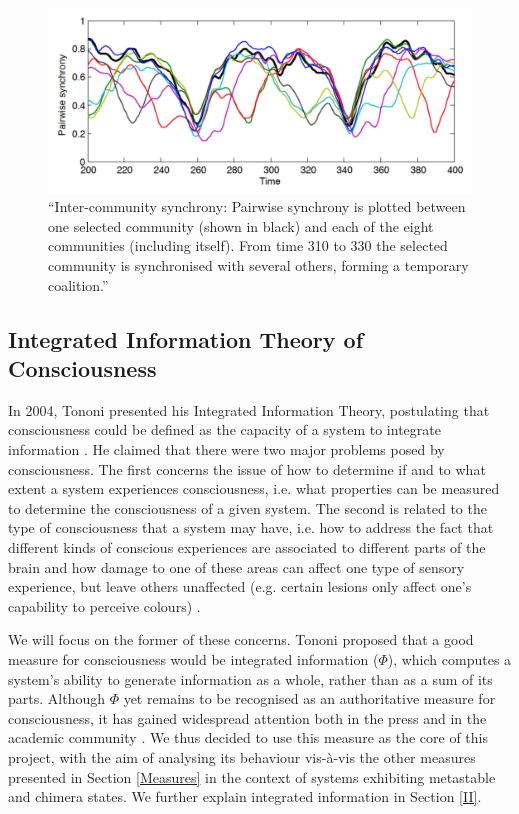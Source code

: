 \documentclass[a4paper,11pt]{article}
\begin{document}
\begin{figure}[H]
\centering
\includegraphics[scale = 0.5]{Shanahan2010_Chimera}
\caption{
	``Inter-community synchrony: Pairwise synchrony is plotted between one selected community (shown in black) and each of the eight communities (including itself). From time 310 to 330 the selected community is synchronised with several others, forming a temporary coalition.'' \cite{Shanahan2010}
	\label{Shanahan2010_Chimera}
}
\end{figure}

\subsection{Integrated Information Theory of Consciousness}
In 2004, Tononi presented his Integrated Information Theory, postulating that consciousness could be defined as the capacity of a system to integrate information \cite{Tononi2004}. He claimed that there were two major problems posed by consciousness. The first concerns the issue of how to determine if and to what extent a system experiences consciousness, i.e. what properties can be measured to determine the consciousness of a given system. The second is related to the type of consciousness that a system may have, i.e. how to address the fact that different kinds of conscious experiences are associated to different parts of the brain and how damage to one of these areas can affect one type of sensory experience, but leave others unaffected (e.g. certain lesions only affect one's capability to perceive colours) \cite{Tononi2008a}.

We will focus on the former of these concerns. Tononi proposed that a good measure for consciousness would be integrated information ($\Phi$), which computes a system's ability to generate information as a whole, rather than as a sum of its parts. Although $\Phi$ yet remains to be recognised as an authoritative measure for consciousness, it has gained widespread attention both in the press and in the academic community \cite{Zimmer2010, Koch2008, Koch2009}. We thus decided to use this measure as the core of this project, with the aim of analysing its behaviour vis-\`{a}-vis the other measures presented in Section \ref{Measures} in the context of systems exhibiting metastable and chimera states. We further explain integrated information in Section \ref{II}.
\end{document}
